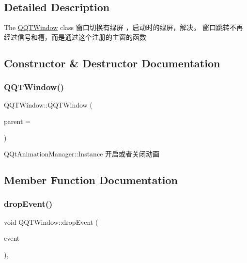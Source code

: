 \subsection{Detailed Description}
The \mbox{\hyperlink{class_q_q_t_window}{Q\+Q\+T\+Window}} class 窗口切换有绿屏 ，启动时的绿屏，解决。 窗口跳转不再经过信号和槽，而是通过这个注册的主窗的函数 

\subsection{Constructor \& Destructor Documentation}
\mbox{\label{class_q_q_t_window_a0c8953e11e38b95f5f57225455a1e951}} 
\subsubsection{\texorpdfstring{Q\+Q\+T\+Window()}{QQTWindow()}}
{\footnotesize\ttfamily Q\+Q\+T\+Window\+::\+Q\+Q\+T\+Window (\begin{DoxyParamCaption}\item[{Q\+Widget $\ast$}]{parent = {} }\end{DoxyParamCaption})\hspace{0.3cm}{\ttfamily [explicit]}}

Q\+Qt\+Animation\+Manager\+::\+Instance 开启或者关闭动画

\subsection{Member Function Documentation}
\mbox{\label{class_q_q_t_window_af1c609c5ba8f3862442c3d1bced11fb4}} 
\subsubsection{\texorpdfstring{drop\+Event()}{dropEvent()}}
{\footnotesize\ttfamily void Q\+Q\+T\+Window\+::drop\+Event (\begin{DoxyParamCaption}\item[{Q\+Drop\+Event $\ast$}]{event }\end{DoxyParamCaption})\hspace{0.3cm}{\ttfamily [override]}, {\ttfamily [protected]}}



